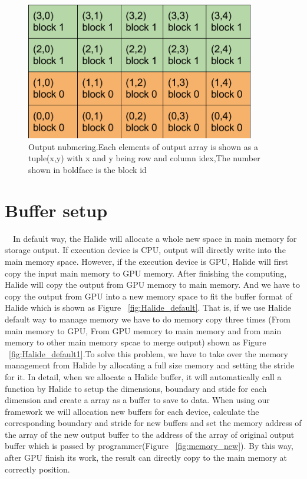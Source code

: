\begin{figure}[H]
\centering
\includegraphics[width=10cm]{img/show_blocks.png}
\caption{Output nubmering.Each elements of output array is shown as a tuple(x,y) with x and y being row and column idex,The number shown in boldface is the block id}
\label{fig:my_label}
\end{figure}

\section{Buffer setup}
\quad \ \ In default way, the Halide will allocate a whole new space in main memory for storage output. If execution device is CPU, output will directly write into the main memory space. However, if the execution device is GPU, Halide will first copy the input main memory to GPU memory. After finishing the computing, Halide will copy the output from GPU memory to main memory. And we have to copy the output from GPU into a new memory space to fit the buffer format of Halide which is shown as Figure ~\ref{fig:Halide_default}. That is, if we use Halide default way to manage memory we have to do memory copy three times (From main memory to GPU, From GPU memory to main memory and from main memory to other main memory spcae to merge output) shown as Figure ~\ref{fig:Halide_default1}.To solve this problem, we have to take over the memory management from Halide by allocating a full size memory and setting the stride for it. In detail, when we  allocate a Halide buffer, it will automatically call a function by Halide to setup the dimensions, boundary and stide for each dimension and create a array as a buffer to save to data. When using our framework we will allocation new buffers for each device, calculate the corresponding boundary and stride for new buffers and set the memory address of the array of the new output buffer to the address of the array of original output buffer which is passed by programmer(Figure ~\ref{fig:memory_new}). By this way, after GPU finish its work, the result can directly copy to the main memory at correctly position.




